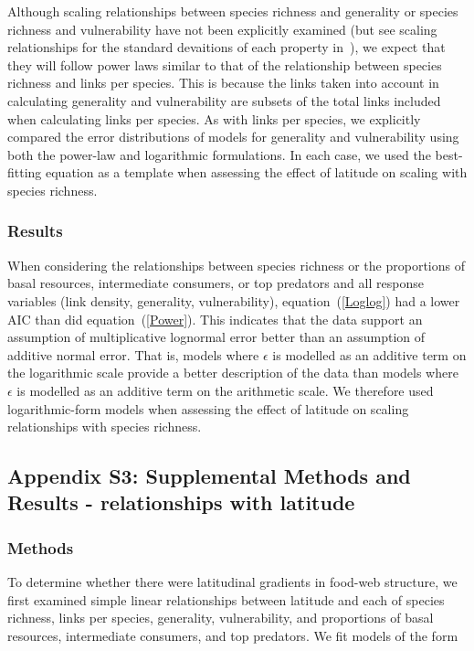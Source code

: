 \documentclass[12pt]{article}
\begin{document}
    Although scaling relationships between species richness and generality or
    species richness and vulnerability have not been explicitly examined (but see scaling 
    relationships for the standard devaitions of each property in~\citet{Riede2010}), we expect that they will follow
    power laws similar to that of the relationship between species richness and links per species.
    This is because the links taken into account in calculating generality and vulnerability are subsets 
    of the total links included when calculating links per species. As with links per species, we explicitly 
    compared the error distributions of models for generality and vulnerability using
    both the power-law and logarithmic formulations. 
    In each case, we used the best-fitting equation as a template when assessing the effect of latitude on scaling with
    species richness.


  \subsubsection*{Results}

    When considering the relationships between species richness or the proportions 
    of basal resources, intermediate consumers, or top predators and all response variables 
    (link density, generality, vulnerability), equation~(\ref{Loglog}) had a
    lower AIC than did equation~(\ref{Power}). This indicates that the
    data support an assumption of multiplicative lognormal error better than an
    assumption of additive normal error. That is, models where $\epsilon$ is
    modelled as an additive term on
    the logarithmic scale provide a better description of the data than models
    where $\epsilon$ is modelled as an additive term on the arithmetic scale.  
    We therefore used logarithmic-form models when assessing the
    effect of latitude on scaling relationships  with species richness.

\subsection*{Appendix S3: Supplemental Methods and Results - relationships with latitude}

  \subsubsection*{Methods}

    To determine whether there were latitudinal gradients in food-web structure,
    we first examined simple linear relationships between latitude and each of 
    species richness, links per species, generality, vulnerability, and proportions
    of basal resources, intermediate consumers, and top predators. We fit models of the form
\end{document}
